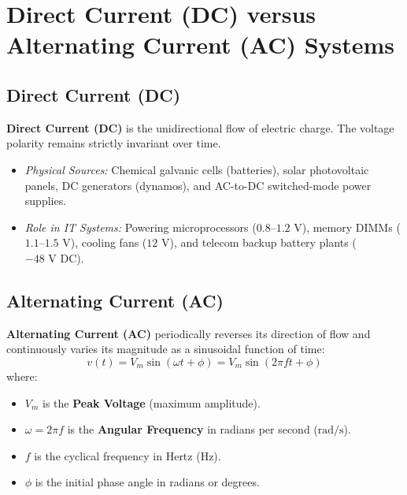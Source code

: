 \section{Direct Current (DC) versus Alternating Current (AC) Systems}
\label{sec:ac_vs_dc}

\subsection{Direct Current (DC)}
\textbf{Direct Current (DC)} is the unidirectional flow of electric charge. The voltage polarity remains strictly invariant over time.
\begin{itemize}
    \item \textit{Physical Sources:} Chemical galvanic cells (batteries), solar photovoltaic panels, DC generators (dynamos), and AC-to-DC switched-mode power supplies.
    \item \textit{Role in IT Systems:} Powering microprocessors ($0.8$--$1.2\text{ V}$), memory DIMMs ($1.1$--$1.5\text{ V}$), cooling fans ($12\text{ V}$), and telecom backup battery plants ($-48\text{ V DC}$).
\end{itemize}

\subsection{Alternating Current (AC)}
\textbf{Alternating Current (AC)} periodically reverses its direction of flow and continuously varies its magnitude as a sinusoidal function of time:
\begin{equation}
\label{eq:sinusoidal_ac}
\boxed{v(t) = V_m \sin(\omega t + \phi) = V_m \sin(2\pi f t + \phi)}
\end{equation}
where:
\begin{itemize}
    \item $V_m$ is the \textbf{Peak Voltage} (maximum amplitude).
    \item $\omega = 2\pi f$ is the \textbf{Angular Frequency} in radians per second ($\text{rad/s}$).
    \item $f$ is the cyclical frequency in Hertz ($\text{Hz}$).
    \item $\phi$ is the initial phase angle in radians or degrees.
\end{itemize}

